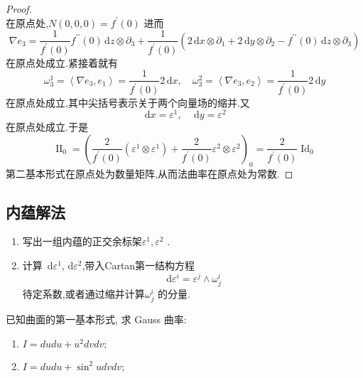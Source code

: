 \documentclass[../../main.tex]{subfiles}
\begin{document}
\begin{proof}
\[   \]   在原点处,\(  N\left( 0,0,0 \right)= f^{\prime} \left( 0 \right)    \)  进而 \[
    \nabla e_3= \frac{1 }{f^{\prime} \left( 0 \right)   }f^{\prime \prime} \left( 0 \right)\,\mathrm{d} z\otimes    \partial _{3}+ \frac{1 }{f^{\prime} \left( 0 \right)  } \left( 2\,\mathrm{d} x\otimes  \partial _{1}+ 2\,\mathrm{d} y\otimes  \partial _{2}-f^{\prime \prime} \left( 0 \right)\,\mathrm{d} z\otimes  \partial _{3}  \right) 
   \] 在原点处成立.紧接着就有 \[
    \omega _{3}^{1}= \left< \nabla e_3,e_1 \right>= \frac{1 }{f^{\prime} \left( 0 \right)  }2 \,\mathrm{d} x,\quad  \omega _{3}^{2}= \left< \nabla e_3,e_2 \right>= \frac{1 }{f^{\prime} \left( 0 \right)  } 2\,\mathrm{d} y  
   \]在原点处成立,其中尖括号表示关于两个向量场的缩并.又\[
   \,\mathrm{d} x=  \varepsilon ^{1},\quad \,\mathrm{d} y=  \varepsilon ^{2}
   \]在原点处成立.于是 \[
   \operatorname{II} _{0}= \left( \frac{2 }{f^{\prime} \left( 0 \right)  } \left(   \varepsilon ^{1}\otimes   \varepsilon ^{1} \right)+ \frac{2 }{f^{\prime} \left( 0 \right)  }\varepsilon ^{2}\otimes   \varepsilon ^{2}    \right)_{0}=  \frac{2 }{f^{\prime} \left( 0 \right)  } \operatorname{Id}_{0}  
   \]第二基本形式在原点处为数量矩阵,从而法曲率在原点处为常数.
\end{proof}

\subsection{内蕴解法}

\begin{method}
    \begin{enumerate}
        \item 写出一组内蕴的正交余标架\(   \varepsilon ^{1}, \varepsilon ^{2}  \) .
        \item 计算 \(  \,\mathrm{d}   \varepsilon ^{1},\,\mathrm{d}  \varepsilon ^{2} \),带入Cartan第一结构方程 \[
        \,\mathrm{d}  \varepsilon ^{i}=  \varepsilon ^{j}\wedge  \omega _{j}^{i}
        \] 待定系数,或者通过缩并计算\(   \omega _{j}^{i}  \) 的分量. 
    \end{enumerate}
    
\end{method}

\begin{problem}
已知曲面的第一基本形式, 求 Gauss 曲率:
\begin{enumerate}
    \item $I = du du + u^2 dv dv;$
    \item $I = du du + \sin^2 u dv dv;$
\end{enumerate}
\end{problem}
\end{document}
